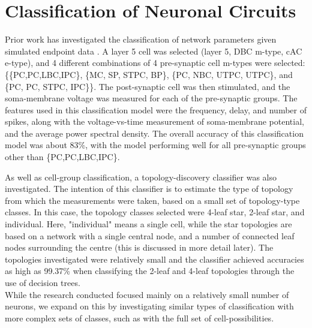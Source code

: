 
\section{Classification of Neuronal Circuits}



Prior work has investigated the classification of network parameters given simulated endpoint data \cite{ekkyProj}. A layer 5 cell was selected (layer 5, DBC m-type, cAC e-type), and 4 different combinations of 4 pre-synaptic cell m-types were selected: \{\{PC,PC,LBC,IPC\}, \{MC, SP, STPC, BP\}, \{PC, NBC, UTPC, UTPC\}, and \{PC, PC, STPC, IPC\}\}. The post-synaptic cell was then stimulated, and the soma-membrane voltage was measured for each of the pre-synaptic groups. The features used in this classification model were the frequency, delay, and number of spikes, along with the voltage-vs-time measurement of soma-membrane potential, and the average power spectral density. The overall accuracy of this classification model was about 83\%, with the model performing well for all pre-synaptic groups other than \{PC,PC,LBC,IPC\}.
\par
As well as cell-group classification, a topology-discovery classifier was also investigated. The intention of this classifier is to estimate the type of topology from which the measurements were taken, based on a small set of topology-type classes. In this case, the topology classes selected were {4-leaf star, 2-leaf star, and individual}. Here, "individual" means a single cell, while the star topologies are based on a network with a single central node, and a number of connected leaf nodes surrounding the centre (this is discussed in more detail later). The topologies investigated were relatively small and the classifier achieved accuracies as high as 99.37\% when classifying the 2-leaf and 4-leaf topologies through the use of decision trees. \\
While the research conducted focused mainly on a relatively small number of neurons, we expand on this by investigating similar types of classification with more complex sets of classes, such as with the full set of cell-possibilities.\\

